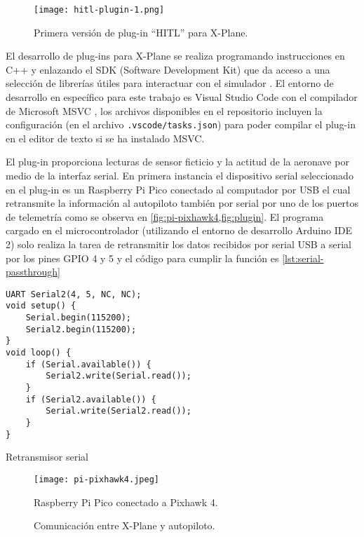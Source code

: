 \begin{figure}[h]
    \centering
    \texttt{[image: hitl-plugin-1.png]}
    \caption{Primera versión de plug-in ``HITL'' para X-Plane.}
    \label{fig:hitl-plugin-1}
\end{figure}

El desarrollo de plug-ins para X-Plane se realiza programando instrucciones en C++ y enlazando el SDK (Software Development Kit) que da acceso a una selección de librerías útiles para interactuar con el simulador \cite{xplane-plugin-dev}. El entorno de desarrollo en específico para este trabajo es Visual Studio Code con el compilador de Microsoft MSVC \cite{vscode-cpp}, los archivos disponibles en el repositorio incluyen la configuración (en el archivo \texttt{.vscode/tasks.json}) para poder compilar el plug-in en el editor de texto si se ha instalado MSVC.

El plug-in proporciona lecturas de sensor ficticio y la actitud de la aeronave por medio de la interfaz serial. En primera instancia el dispositivo serial seleccionado en el plug-in es un Raspberry Pi Pico conectado al computador por USB el cual retransmite la información al autopiloto también por serial por uno de los puertos de telemetría como se observa en \cref{fig:pi-pixhawk4,fig:plugin}. El programa cargado en el microcontrolador (utilizando el entorno de desarrollo Arduino IDE 2) solo realiza la tarea de retransmitir los datos recibidos por serial USB a serial por los pines GPIO 4 y 5 y el código para cumplir la función es \cref{lst:serial-passthrough}

\begin{listing}[h]
    \begin{verbatim}
UART Serial2(4, 5, NC, NC);
void setup() {
    Serial.begin(115200);
    Serial2.begin(115200);
}
void loop() {
    if (Serial.available()) {
        Serial2.write(Serial.read());
    }
    if (Serial2.available()) {
        Serial.write(Serial2.read());
    }
}
    \end{verbatim}
    \caption{Retransmisor serial}
    \label{lst:serial-passthrough}
\end{listing}

\begin{figure}[h]
    \centering
    \texttt{[image: pi-pixhawk4.jpeg]}
    \caption{Raspberry Pi Pico conectado a Pixhawk 4.}
    \label{fig:pi-pixhawk4}
\end{figure}

\begin{figure}[h]
    \centering
    
    \caption{Comunicación entre X-Plane y autopiloto.}
    \label{fig:plugin}
\end{figure}

